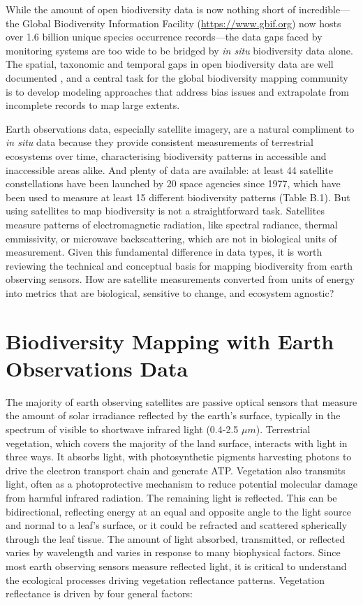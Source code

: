 While the amount of open biodiversity data is now nothing short of incredible—the Global Biodiversity Information Facility (\url{https://www.gbif.org}) now hosts over 1.6 billion unique species occurrence records—the data gaps faced by monitoring systems are too wide to be bridged by \textit{in situ} biodiversity data alone. The spatial, taxonomic and temporal gaps in open biodiversity data are well documented \cite{Beck2014-am, Hortal2015-gc, Geijzendorffer2016-xv}, and a central task for the global biodiversity mapping community is to develop modeling approaches that address bias issues and extrapolate from incomplete records to map large extents.

Earth observations data, especially satellite imagery, are a natural compliment to \textit{in situ} data because they provide consistent measurements of terrestrial ecosystems over time, characterising biodiversity patterns in accessible and inaccessible areas alike. And plenty of data are available: at least 44 satellite constellations have been launched by 20 space agencies since 1977, which have been used to measure at least 15 different biodiversity patterns (Table B.1). But using satellites to map biodiversity is not a straightforward task. Satellites measure patterns of electromagnetic radiation, like spectral radiance, thermal emmissivity, or microwave backscattering, which are not in biological units of measurement. Given this fundamental difference in data types, it is worth reviewing the technical and conceptual basis for mapping biodiversity from earth observing sensors. How are satellite measurements converted from units of energy into metrics that are biological, sensitive to change, and ecosystem agnostic?

\section{Biodiversity Mapping with Earth Observations Data}

The majority of earth observing satellites are passive optical sensors that measure the amount of solar irradiance reflected by the earth's surface, typically in the spectrum of visible to shortwave infrared light (0.4-2.5 $\mu m$). Terrestrial vegetation, which covers the majority of the land surface, interacts with light in three ways. It absorbs light, with photosynthetic pigments harvesting photons to drive the electron transport chain and generate ATP. Vegetation also transmits light, often as a photoprotective mechanism to reduce potential molecular damage from harmful infrared radiation. The remaining light is reflected. This can be bidirectional, reflecting energy at an equal and opposite angle to the light source and normal to a leaf's surface, or it could be refracted and scattered spherically through the leaf tissue. The amount of light absorbed, transmitted, or reflected varies by wavelength and varies in response to many biophysical factors. Since most earth observing sensors measure reflected light, it is critical to understand the ecological processes driving vegetation reflectance patterns. Vegetation reflectance is driven by four general factors:

